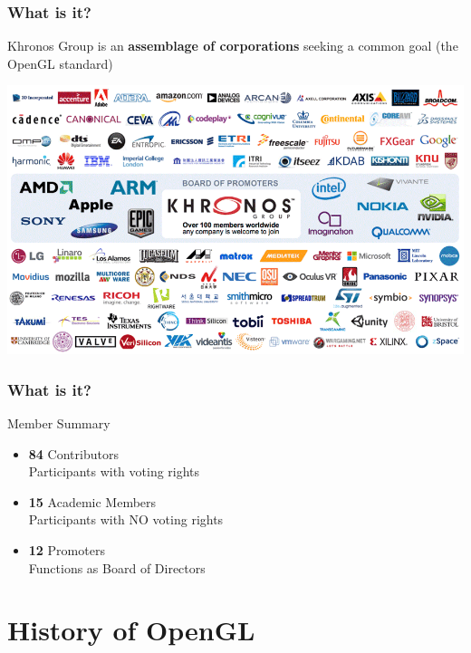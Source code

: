 \documentclass[10pt, compress]{beamer}
\begin{document}
\begin{frame}[fragile]
    \frametitle{What is it?}
    
    \begin{center} Khronos Group is an \textbf{assemblage of corporations} seeking a common goal (the OpenGL standard) \end{center}
    
    \includegraphics[width=\textwidth]{images/members.png}
    
\end{frame}

\begin{frame}[fragile]
    \frametitle{What is it?}
    
    \begin{center} Member Summary \end{center}
    \begin{itemize}
    \item \textbf{84} Contributors \\ \hspace{3mm} Participants with voting rights
    \item \textbf{15} Academic Members \\ \hspace{3mm} Participants with NO voting rights
    \item \textbf{12} Promoters \\ \hspace{3mm} Functions as Board of Directors
    \end{itemize}
    
\end{frame}

\section{History of OpenGL}
\end{document}
